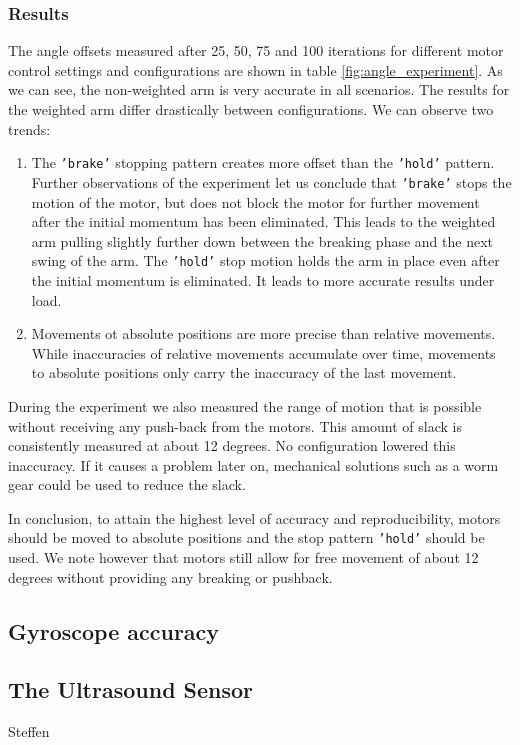 \documentclass[11pt, a4paper]{article}
\begin{document}
\subsubsection*{Results}
The angle offsets measured after 25, 50, 75 and 100 iterations for different motor control settings and configurations are shown in table \ref{fig:angle_experiment}. As we can see, the non-weighted arm is very accurate in all scenarios. The results for the weighted arm differ drastically between configurations. We can observe two trends:
\begin{enumerate}
	\item The \texttt{'brake'} stopping pattern creates more offset than the \texttt{'hold'} pattern. Further observations of the experiment let us conclude that \texttt{'brake'} stops the motion of the motor, but does not block the motor for further movement after the initial momentum has been eliminated. This leads to the weighted arm pulling slightly further down between the breaking phase and the next swing of the arm. The \texttt{'hold'} stop motion holds the arm in place even after the initial momentum is eliminated. It leads to more accurate results under load.
	\item Movements ot absolute positions are more precise than relative movements. While inaccuracies of relative movements accumulate over time, movements to absolute positions only carry the inaccuracy of the last movement.
\end{enumerate}
During the experiment we also measured the range of motion that is possible without receiving any push-back from the motors. This amount of slack is consistently measured at about 12 degrees. No configuration lowered this inaccuracy. If it causes a problem later on, mechanical solutions such as a worm gear could be used to reduce the slack.

\bigskip
In conclusion, to attain the highest level of accuracy and reproducibility, motors should be moved to absolute positions and the stop pattern \texttt{'hold'} should be used. We note however that motors still allow for free movement of about 12 degrees without providing any breaking or pushback.




\subsection{Gyroscope accuracy}

\subsection{The Ultrasound Sensor}
Steffen
\end{document}
